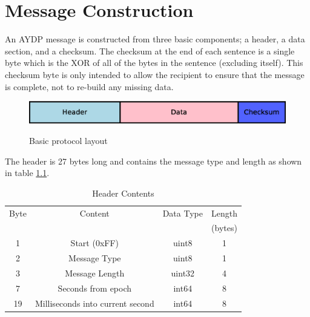\chapter{Message Construction}
An AYDP message is constructed from three basic components; a header, a data section, and a checksum. The checksum at the end of each sentence is a single byte which is the XOR of all of the bytes in the sentence (excluding itself). This checksum byte is only intended to allow the recipient to ensure that the message is complete, not to re-build any missing data.

\begin{figure}[H]
  \centering
  \includegraphics[width=1.0\textwidth]{Figures/protocolBasicLayout.eps}
  \label{figure:msg:basicProto}
  \caption{Basic protocol layout}
\end{figure}

The header is 27 bytes long and contains the message type and length as shown in table \ref{table:msg:header}.

\begin{table}[H]
  \centering
  \begin{tabular}{ c c c c }
  Byte &          Content    & Data Type & Length  \\
       &                     &           & (bytes) \\
\hline
   1   &  Start (0xFF)       &   uint8   &    1    \\
   2   &  Message Type       &   uint8   &    1    \\
   3   &  Message Length     &   uint32  &    4    \\
   7   &  Seconds from epoch &   int64   &    8    \\
   19  &  Milliseconds into current second & int64 & 8 \\
  \end{tabular}
  \caption{Header Contents}
  \label{table:msg:header}
\end{table}

 